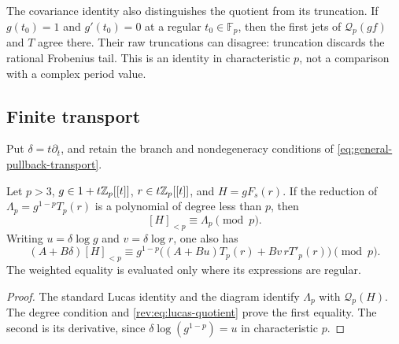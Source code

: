 The covariance identity also distinguishes the quotient from its
truncation. If $g(t_0)=1$ and $g'(t_0)=0$ at a regular
$t_0\in\mathbb F_p$, then the first jets of $\mathcal Q_p(gf)$ and
$T$ agree there. Their raw truncations can disagree: truncation
discards the rational Frobenius tail. This is an identity in
characteristic $p$, not a comparison with a complex period value.

\subsection{Finite transport}
Put $\delta=t\partial_t$, and retain the branch and nondegeneracy
conditions of \eqref{eq:general-pullback-transport}.

\begin{lemma}
\label{lem:finite-frobenius-pullback}
Let $p>3$, $g\in1+t\mathbb Z_p[[t]]$, $r\in t\mathbb Z_p[[t]]$, and
$H=gF_s(r)$. If the reduction of
$\Lambda_p=g^{1-p}T_p(r)$ is a polynomial of degree less than $p$,
then
\begin{equation}\label{eq:finite-frobenius-pullback}
 [H]_{<p}\equiv\Lambda_p\pmod p.
\end{equation}
Writing $u=\delta\log g$ and $v=\delta\log r$, one also has
\begin{equation}\label{eq:finite-weighted-pullback}
 (A+B\delta)[H]_{<p}
 \equiv g^{1-p}\bigl((A+Bu)T_p(r)+Bv\,rT'_p(r)\bigr)\pmod p.
\end{equation}
The weighted equality is evaluated only where its expressions are
regular.
\end{lemma}
\begin{proof}
The standard Lucas identity and the diagram identify
$\Lambda_p$ with $\mathcal Q_p(H)$. The degree condition and
\eqref{rev:eq:lucas-quotient} prove the first equality. The second
is its derivative, since $\delta\log(g^{1-p})=u$ in characteristic
$p$.
\end{proof}


